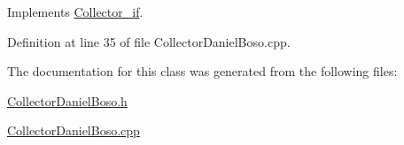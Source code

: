 Implements \hyperlink{class_collector__if_a97fa632508ffdfad1365b3a949acf745}{Collector\-\_\-if}.



Definition at line 35 of file Collector\-Daniel\-Boso.\-cpp.



The documentation for this class was generated from the following files\-:\begin{DoxyCompactItemize}
\item 
\hyperlink{_collector_daniel_boso_8h}{Collector\-Daniel\-Boso.\-h}\item 
\hyperlink{_collector_daniel_boso_8cpp}{Collector\-Daniel\-Boso.\-cpp}\end{DoxyCompactItemize}
